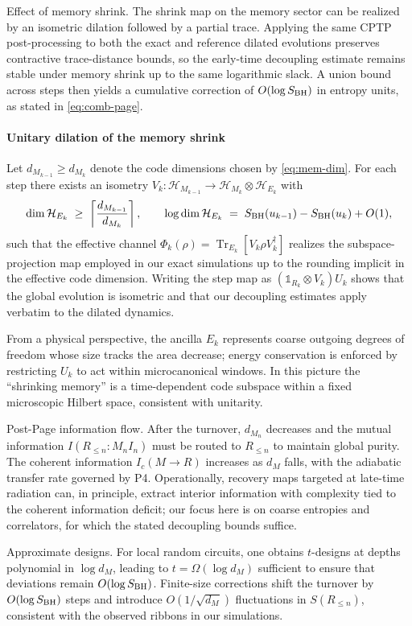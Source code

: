 \documentclass[a4paper,11pt]{article}
\newcommand{\mathbbm}[1]{\mathbb{#1}}
\newcommand{\Tr}{\operatorname{Tr}}
\theoremstyle{plain}
\theoremstyle{definition}
\theoremstyle{remark}
\begin{document}
Effect of memory shrink. The shrink map on the memory sector can be realized by an isometric dilation followed by a partial trace. Applying the same CPTP post-processing to both the exact and reference dilated evolutions preserves contractive trace-distance bounds, so the early-time decoupling estimate remains stable under memory shrink up to the same logarithmic slack. A union bound across steps then yields a cumulative correction of $O(\log S_{\rm BH})$ in entropy units, as stated in \eqref{eq:comb-page}.

\paragraph{Unitary dilation of the memory shrink}
Let $d_{M_{k-1}}\ge d_{M_k}$ denote the code dimensions chosen by \eqref{eq:mem-dim}. For each step there exists an isometry $V_k:\mathcal{H}_{M_{k-1}}\to\mathcal{H}_{M_k}\otimes\mathcal{H}_{E_k}$ with
\[
\dim \mathcal{H}_{E_k}\;\ge\;\left\lceil \frac{d_{M_{k-1}}}{d_{M_k}} \right\rceil,
\qquad
\log \dim \mathcal{H}_{E_k}\;=\;S_{\rm BH}(u_{k-1})-S_{\rm BH}(u_k)+O(1),
\]
such that the effective channel $\Phi_k(\rho)=\Tr_{E_k}[V_k \rho V_k^\dagger]$ realizes the subspace-projection map employed in our exact simulations up to the rounding implicit in the effective code dimension. Writing the step map as $(\mathbbm{1}_{R_k}\otimes V_k)U_k$ shows that the global evolution is isometric and that our decoupling estimates apply verbatim to the dilated dynamics.

From a physical perspective, the ancilla $E_k$ represents coarse outgoing degrees of freedom whose size tracks the area decrease; energy conservation is enforced by restricting $U_k$ to act within microcanonical windows. In this picture the ``shrinking memory'' is a time-dependent code subspace within a fixed microscopic Hilbert space, consistent with unitarity.

Post-Page information flow. After the turnover, $d_{M_n}$ decreases and the mutual information $I(R_{\le n}:M_n I_n)$ must be routed to $R_{\le n}$ to maintain global purity. The coherent information $I_c(M\to R)$ increases as $d_M$ falls, with the adiabatic transfer rate governed by P4. Operationally, recovery maps targeted at late-time radiation can, in principle, extract interior information with complexity tied to the coherent information deficit; our focus here is on coarse entropies and correlators, for which the stated decoupling bounds suffice.

Approximate designs. For local random circuits, one obtains $t$-designs at depths polynomial in $\log d_M$, leading to $t=\Omega(\log d_M)$ sufficient to ensure that deviations remain $O(\log S_{\rm BH})$. Finite-size corrections shift the turnover by $O(\log S_{\rm BH})$ steps and introduce $O(1/\sqrt{d_M})$ fluctuations in $S(R_{\le n})$, consistent with the observed ribbons in our simulations.
\end{document}
